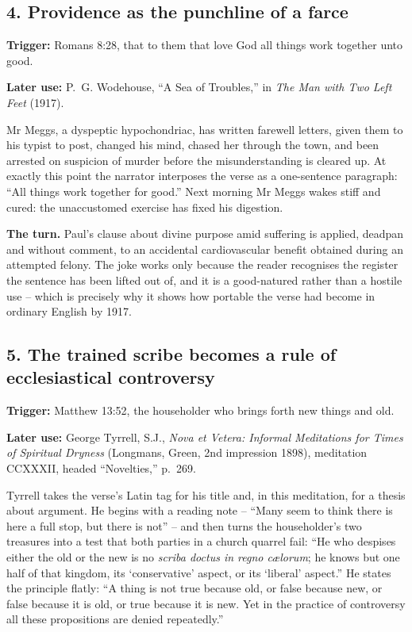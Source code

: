 \subsection*{4. Providence as the punchline of a farce}

\textbf{Trigger:} Romans 8:28, that to them that love God all things work together unto good.\par\noindent
\textbf{Later use:} P.~G. Wodehouse, ``A Sea of Troubles,'' in \emph{The Man with Two Left Feet} (1917).

Mr Meggs, a dyspeptic hypochondriac, has written farewell letters, given them to his typist to post, changed his mind, chased her through the town, and been arrested on suspicion of murder before the misunderstanding is cleared up. At exactly this point the narrator interposes the verse as a one-sentence paragraph: ``All things work together for good.'' Next morning Mr Meggs wakes stiff and cured: the unaccustomed exercise has fixed his digestion.

\textbf{The turn.} Paul's clause about divine purpose amid suffering is applied, deadpan and without comment, to an accidental cardiovascular benefit obtained during an attempted felony. The joke works only because the reader recognises the register the sentence has been lifted out of, and it is a good-natured rather than a hostile use -- which is precisely why it shows how portable the verse had become in ordinary English by 1917.

\subsection*{5. The trained scribe becomes a rule of ecclesiastical controversy}

\textbf{Trigger:} Matthew 13:52, the householder who brings forth new things and old.\par\noindent
\textbf{Later use:} George Tyrrell, S.J., \emph{Nova et Vetera: Informal Meditations for Times of Spiritual Dryness} (Longmans, Green, 2nd impression 1898), meditation CCXXXII, headed ``Novelties,'' p.~269.

Tyrrell takes the verse's Latin tag for his title and, in this meditation, for a thesis about argument. He begins with a reading note -- ``Many seem to think there is here a full stop, but there is not'' -- and then turns the householder's two treasures into a test that both parties in a church quarrel fail: ``He who despises either the old or the new is no \emph{scriba doctus in regno c\ae lorum}; he knows but one half of that kingdom, its `conservative' aspect, or its `liberal' aspect.'' He states the principle flatly: ``A thing is not true because old, or false because new, or false because it is old, or true because it is new. Yet in the practice of controversy all these propositions are denied repeatedly.''

